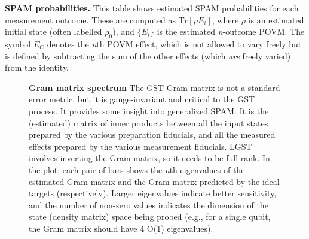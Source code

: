 \documentclass{article}[11pt]
\newcommand{\putfield}[2]{#2}
\begin{document}
{\begin{table}[h]
\begin{center}
  \end{center}
\end{table}

\begin{table}[h]
  \begin{center}
    \begin{adjustbox}{max width=\textwidth}
      \putfield{final_model_spam_parameters_table}{}
    \end{adjustbox}
    \caption{\textbf{SPAM probabilities.} This table shows estimated SPAM probabilities for each measurement outcome.  These are computed as $\mathrm{Tr}[\rho E_i]$, where $\rho$ is an estimated initial state (often labelled $\rho_0$), and $\{E_i\}$ is the estimated \emph{n}-outcome POVM.  The symbol $E_C$ denotes the \emph{n}th POVM effect, which is not allowed to vary freely but is defined by subtracting the sum of the other effects (which \emph{are} freely varied) from the identity.}
  \end{center}
\end{table}


\begin{figure}[h]
  \begin{center}
    \begin{adjustbox}{max width=\textwidth}
      \putfield{gram_bar_plot}{}
    \end{adjustbox}
    \caption{\textbf{Gram matrix spectrum} The GST Gram matrix is not a standard error metric, but it is gauge-invariant and critical to the GST process.  It provides some insight into generalized SPAM.  It is the (estimated) matrix of inner products between all the input states prepared by the various preparation fiducials, and all the measured effects prepared by the various measurement fiducials.  LGST involves inverting the Gram matrix, so it needs to be full rank.  In the plot, each pair of bars shows the \emph{n}th  eigenvalues of the estimated Gram matrix and the Gram matrix predicted by the ideal targets (respectively).  Larger eigenvalues indicate better sensitivity, and the number of non-zero values indicates the dimension of the state (density matrix) space being probed (e.g., for a single qubit, the Gram matrix should have 4 O(1) eigenvalues).}
  \end{center}
\end{figure}


}
\end{document}
